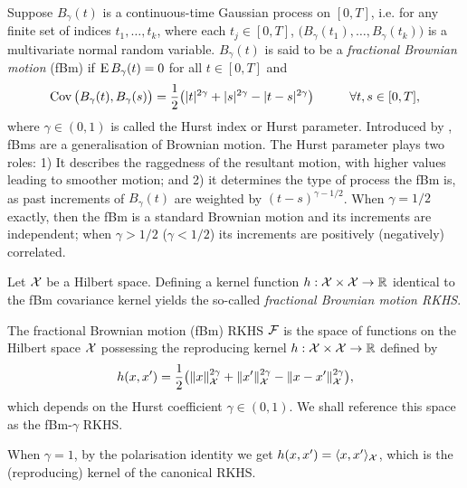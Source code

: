 Suppose $B_\gamma(t)$ is a continuous-time Gaussian process on $[0,T]$, i.e. for any finite set of indices $t_1,\dots,t_k$, where each $t_j \in [0,T]$, $\big(B_\gamma(t_1),\dots,B_\gamma(t_k)\big)$ is a multivariate normal random variable.
$B_\gamma(t)$ is said to be a \emph{fractional Brownian motion} (fBm) if $\operatorname{E} B_\gamma(t) = 0$ for all $t \in [0,T]$ and 
\[
  \operatorname{Cov}\big(B_\gamma(t),B_\gamma(s) \big) = \frac{1}{2}\big( |t|^{2\gamma} + |s|^{2\gamma} - |t-s|^{2\gamma} \big) \hspace{1cm} \forall t,s \in [0,T],
\]
where $\gamma \in (0,1)$ is called the Hurst index or Hurst parameter.
Introduced by \citet{mandelbrot1968fractional}, fBms are a generalisation of Brownian motion.
The Hurst parameter plays two roles: 1) It describes the raggedness of the resultant motion, with higher values leading to smoother motion; and 2) it determines the type of process the fBm is, as past increments of $B_\gamma(t)$ are weighted by $(t-s)^{\gamma-1/2}$.
When $\gamma=1/2$ exactly, then the fBm is a standard Brownian motion and its increments are independent; when $\gamma > 1/2$ ($\gamma < 1/2$) its increments are positively (negatively) correlated.


Let ${\mathcal X}$ be a Hilbert space. 
Defining a kernel function $h:{\mathcal X}\times{\mathcal X}\to\mathbb{R}$ identical to the fBm covariance kernel yields the so-called \emph{fractional Brownian motion RKHS}.

\begin{definition}\label{def:fbmrkhs}
  The fractional Brownian motion (fBm) RKHS ${\mathcal F}$ is the space of functions on the Hilbert space ${\mathcal X}$ possessing the reproducing kernel $h:{\mathcal X}\times{\mathcal X}\to\mathbb{R}$ defined by
  \[
    h(x,x') = \frac{1}{2}\big( \lVert x\rVert_{\mathcal X}^{2\gamma} + \lVert x'\rVert_{\mathcal X}^{2\gamma} - \lVert x-x'\rVert_{\mathcal X}^{2\gamma} \big),
  \]
  which depends on the Hurst coefficient $\gamma \in (0,1)$.
  We shall reference this space as the fBm-$\gamma$ RKHS.
\end{definition}

\begin{remark}
  When $\gamma=1$, by the polarisation identity we get $h(x,x') = \langle x,x'\rangle_{\mathcal X}$, which is the (reproducing) kernel of the canonical RKHS.
\end{remark}

